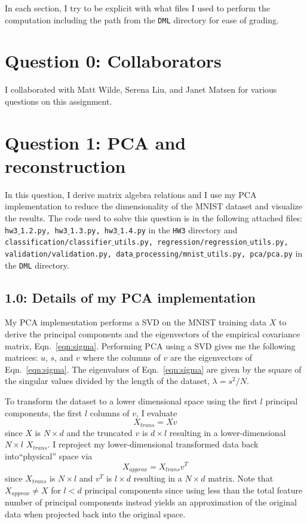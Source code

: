 \documentclass[12pt]{amsart}
\begin{document}
In each section, I try to be explicit with what files I used to perform the computation including the path from the {\tt DML} directory for ease of grading.

\section*{Question 0: Collaborators}
I collaborated with Matt Wilde, Serena Liu, and Janet Matsen for various questions on this assignment.

\section*{Question 1: PCA and reconstruction}
In this question, I derive matrix algebra relations and I use my PCA implementation to reduce the dimensionality of the MNIST dataset and visualize the results.  The code used to solve this question is in the following attached files: {\tt hw3$\_$1.2.py, hw3$\_$1.3.py, hw3$\_$1.4.py} in the {\tt HW3} directory and {\tt classification/classifier$\_$utils.py, regression/regression$\_$utils.py, validation/validation.py, data$\_$processing/mnist$\_$utils.py, pca/pca.py} in the {\tt DML} directory.

\subsection*{1.0: Details of my PCA implementation}
My PCA implementation performs a SVD on the MNIST training data $X$ to derive the principal components and the eigenvectors of the empirical covariance matrix, Eqn.~\ref{eqn:sigma}.   Performing PCA using a SVD gives me the following matrices: $u$, $s$, and $v$ where the columns of $v$ are the eigenvectors of Eqn.~\ref{eqn:sigma}.  The eigenvalues of Eqn.~\ref{eqn:sigma} are given by the square of the singular values divided by the length of the dataset, $\lambda = s^2/N$.

To transform the dataset to a lower dimensional space using the first $l$ principal components, the first $l$ columns of $v$, I evaluate
\begin{equation} \label{eqn:pca_transform}
X_{trans} = Xv
\end{equation}
since $X$ is $N \times d$ and the truncated $v$ is $d \times l$ resulting in a lower-dimensional $N \times l$ $X_{trans}$.  I reproject my lower-dimensional transformed data back into``physical'' space via
\begin{equation} \label{eqn:pca_inverse_transform}
X_{approx} = X_{trans}v^T
\end{equation} 
since $X_{trans}$ is $N \times l$ and $v^T$ is $l \times d$ resulting in a $N \times d$ matrix.  Note that $X_{approx} \neq X$ for $l < d$ principal components since using less than the total feature number of principal components instead yields an approximation of the original data when projected back into the original space.
\end{document}
